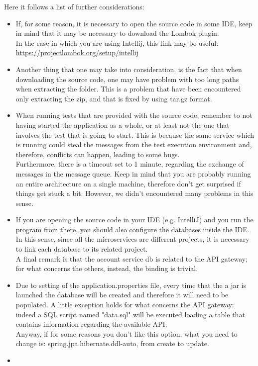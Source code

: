 \par 
Here it follows a list of further considerations: 
\begin{itemize}
\item If, for some reason, it is necessary to open the source code in some IDE, keep in mind that it
may be necessary to download the Lombok plugin. \\
In the case in which you are using Intellij, this link may be useful:\\
\url{https://projectlombok.org/setup/intellij}

\item Another thing that one may take into consideration, is the fact that when downloading the source code, one may have problem with too long
paths when extracting the folder. This is a problem that have been encountered only extracting the zip, and that is fixed
by using tar.gz format. 

\item When running tests that are provided with the source code, remember to not having started the application as a whole, or at least not
the one that involves the test that is going to start. This is because the same service which is running could steal the messages from the test execution environment and, therefore, conflicts can happen, leading to some bugs. \\
Furthermore, there is a timeout set to 1 minute, regarding the exchange of messages in the message queue. Keep in mind that you are probably
running an entire architecture on a single machine, therefore don't get surprised if things get stuck a bit. However, we didn't encountered
many problems in this sense.

\item If you are opening the source code in your IDE (e.g. IntelliJ) and you run the program from there, you should also configure
the databases inside the IDE. In this sense, since all the microservices are different projects, it is necessary to link each database
to its related project. \\ A final remark is that the account service db is related to the API gateway; for what concerns the others, instead,
the binding is trivial.   

\item Due to setting of the application.properties file, every time that the a jar is launched the database will be created and therefore
it will need to be populated. A little exception holds for what concerns the API gateway: indeed a SQL script named "data.sql" will be
executed loading a table that contains information regarding the available API. \\ 
Anyway, if for some reasons you don't like this option, what you need to change is: spring.jpa.hibernate.ddl-auto, from create to update.

\item 
\end{itemize}

